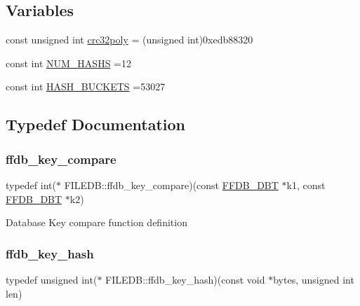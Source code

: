 \subsection*{Variables}
\begin{DoxyCompactItemize}
\item 
const unsigned int \mbox{\hyperlink{namespaceFILEDB_a8a86234763af41b14f1cfcf436e8674f}{crc32poly}} = (unsigned int)0xedb88320
\item 
const int \mbox{\hyperlink{namespaceFILEDB_ae46b35f4ae3d23ec8b3470306fef8ab5}{N\+U\+M\+\_\+\+H\+A\+S\+HS}} =12
\item 
const int \mbox{\hyperlink{namespaceFILEDB_a791b55170820bb840d3e7d583f363415}{H\+A\+S\+H\+\_\+\+B\+U\+C\+K\+E\+TS}} =53027
\end{DoxyCompactItemize}


\subsection{Typedef Documentation}
\mbox{\label{namespaceFILEDB_a1d3bd589ccfab62ecdd78b46aba576e2}} 
\subsubsection{\texorpdfstring{ffdb\_key\_compare}{ffdb\_key\_compare}}
{\footnotesize\ttfamily typedef int($\ast$ F\+I\+L\+E\+D\+B\+::ffdb\+\_\+key\+\_\+compare)(const \mbox{\hyperlink{adat-devel_2other__libs_2filedb_2filehash_2ffdb__db_8h_aa2e0984399491df0fdd20898ca8758f9}{F\+F\+D\+B\+\_\+\+D\+BT}} $\ast$k1, const \mbox{\hyperlink{adat-devel_2other__libs_2filedb_2filehash_2ffdb__db_8h_aa2e0984399491df0fdd20898ca8758f9}{F\+F\+D\+B\+\_\+\+D\+BT}} $\ast$k2)}

Database Key compare function definition \mbox{\label{namespaceFILEDB_a62446cf48b614494d5708110ddc414bf}} 
\subsubsection{\texorpdfstring{ffdb\_key\_hash}{ffdb\_key\_hash}}
{\footnotesize\ttfamily typedef unsigned int($\ast$ F\+I\+L\+E\+D\+B\+::ffdb\+\_\+key\+\_\+hash)(const void $\ast$bytes, unsigned int len)}

